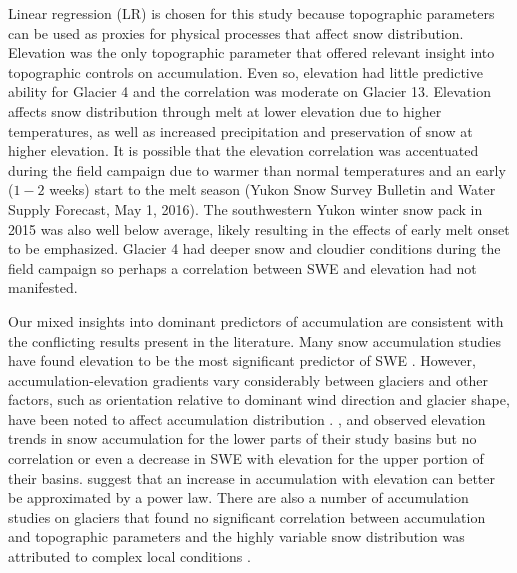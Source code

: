 \documentclass[twocolumn,letterpaper]{igs}
\begin{document}
Linear regression (LR) is chosen for this study because topographic parameters can be used as proxies for physical processes that affect snow distribution. Elevation was the only topographic parameter that offered relevant insight into topographic controls on accumulation. Even so, elevation had little predictive ability for Glacier 4 and the correlation was moderate on Glacier 13. Elevation affects snow distribution through melt at lower elevation due to higher temperatures, as well as increased precipitation and preservation of snow at higher elevation. It is possible that the elevation correlation was accentuated during the field campaign due to warmer than normal temperatures and an early ($1-2$ weeks) start to the melt season (Yukon Snow Survey Bulletin and Water Supply Forecast, May 1, 2016). The southwestern Yukon winter snow pack in 2015 was also well below average, likely resulting in the effects of early melt onset to be emphasized. Glacier 4 had deeper snow and cloudier conditions during the field campaign so perhaps a correlation between SWE and elevation had not manifested. 

Our mixed insights into dominant predictors of accumulation are consistent with the conflicting results present in the literature. Many snow accumulation studies have found elevation to be the most significant predictor of SWE \citep[e.g.][]{Machguth2006, McGrath2015}. However, accumulation-elevation gradients vary considerably between glaciers \citep{Winther1998} and other factors, such as orientation relative to dominant wind direction and glacier shape, have been noted to affect accumulation distribution \citep{Machguth2006,Grabiec2011}.  \cite{Machguth2006}, \cite{Grunewald2014} and \cite{Kirchner2014} observed elevation trends in snow accumulation for the lower parts of their study basins but no correlation or even a decrease in SWE with elevation for the upper portion of their basins. \cite{Helbig2017} suggest that an increase in accumulation with elevation can better be approximated by a power law. There are also a number of accumulation studies on glaciers that found no significant correlation between accumulation and topographic parameters and the highly variable snow distribution was attributed to complex local conditions \citep[e.g.][]{Grabiec2011,Lopez2011}.
\end{document}
